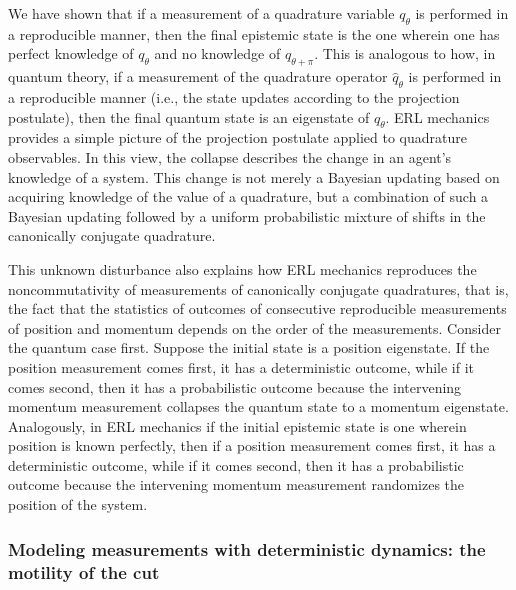 \documentclass[pra,superscriptaddress,nofootinbib,12pt]{revtex4-2}
\begin{document}
We have shown that if a measurement of a quadrature variable $q_{\theta}$ is performed in a reproducible manner, then the final epistemic state is the one wherein one has perfect knowledge of $q_{\theta}$ and no knowledge of $q_{\theta+\pi}$. This is analogous to how, in quantum theory, if a measurement of the quadrature operator $\hat{q}_{\theta}$ is performed in a reproducible manner (i.e., the state updates according to the projection postulate), then the final quantum state is an eigenstate of $\hat{q}_{\theta}$.  ERL mechanics provides a simple picture of the projection postulate applied to quadrature observables.  In this view, the collapse describes the change in an agent's knowledge of a system.  This change is not merely a Bayesian updating based on acquiring knowledge of the value of a quadrature, but a combination of such a Bayesian updating followed by a uniform probabilistic mixture of shifts in the canonically conjugate quadrature.

This unknown disturbance also explains how ERL mechanics reproduces the noncommutativity of measurements of canonically conjugate quadratures, that is, the fact that the statistics of outcomes of consecutive reproducible measurements of position and momentum depends on the order of the measurements.  Consider the quantum case first. Suppose the initial state is a position eigenstate. If the position measurement comes first, it has a deterministic outcome, while if it comes second, then it has a probabilistic outcome because the intervening momentum measurement collapses the quantum state to a momentum eigenstate.  Analogously, in ERL mechanics if the initial epistemic state is one wherein position is known perfectly, then if a position measurement comes first, it has a deterministic outcome, while if it comes second, then it has a probabilistic outcome because the intervening momentum measurement randomizes the position of the system.

\subsubsection{Modeling measurements with deterministic dynamics: the motility of the cut}
\label{sec:motilityofthecut}
\end{document}
